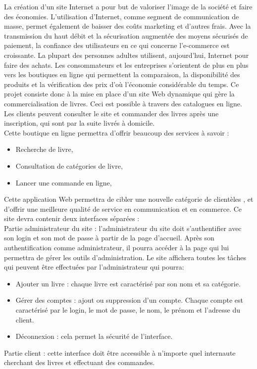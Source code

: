 La création d’un site Internet a pour but de valoriser l'image de la société et faire des économies. L'utilisation d'Internet, comme segment de communication de masse, permet également de baisser des coûts marketing et d'autres frais. Avec la transmission du haut débit et la sécurisation augmentée des moyens sécurisés de paiement, la confiance des utilisateurs en ce qui concerne l'e-commerce est croissante. La plupart des personnes adultes utilisent, aujourd’hui, Internet pour faire des achats. Les consommateurs et les entreprises s'orientent de plus en plus vers les boutiques en ligne qui permettent la comparaison, la disponibilité des produits et la vérification des prix d’où l’économie considérable du temps.
\bigbreak
Ce projet consiste donc à la mise en place d’un site Web dynamique qui gère la commercialisation de livres. Ceci est possible à travers des catalogues en ligne. Les clients peuvent consulter le site et commander des livres après une inscription, qui sont par la suite livrés à domicile.\\

Cette boutique en ligne permettra d’offrir beaucoup des services à savoir :
\begin{itemize}
\item Recherche de livre,
\item Consultation de catégories de livre,
\item Lancer une commande en ligne,
\end{itemize}
\bigbreak
Cette application Web permettra de cibler une nouvelle catégorie de clientèles , et d’offrir une meilleure qualité de service en communication et en commerce. Ce site devra contenir deux interfaces séparées :\\

Partie administrateur du site : l’administrateur du site doit s’authentifier avec son login et son mot de passe à partir de la page d’accueil. Après son authentification comme administrateur, il pourra accéder à la page qui lui permettra de gérer les outils d’administration. Le site affichera toutes les tâches qui peuvent être effectuées par l’administrateur qui pourra:

\begin{itemize}
\item Ajouter un livre : chaque livre est caractérisé par son nom et sa catégorie.
\item Gérer des comptes : ajout ou suppression d’un compte. Chaque compte est caractérisé par le login, le mot de passe, le nom, le prénom et l'adresse du client.
\item Déconnexion : cela permet la sécurité de l’interface.
\end{itemize}
\bigbreak
Partie client : cette interface doit être accessible à n’importe quel internaute cherchant des livres et effectuant des commandes.


